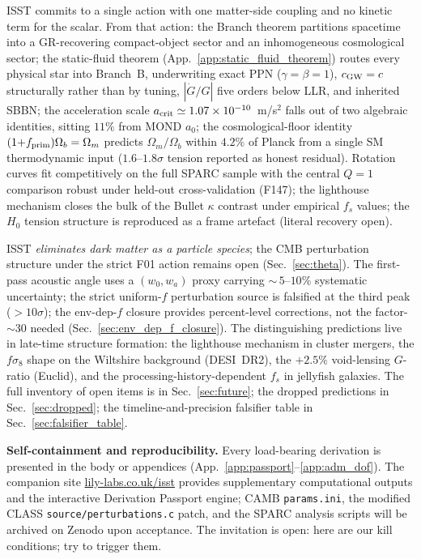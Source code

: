 \documentclass[aps,prd,twocolumn,nofootinbib,floatfix,superscriptaddress]{revtex4-2}
\newcommand{\fprim}{f_{\rm prim}}
\begin{document}
ISST commits to a single action with one matter-side coupling and
no kinetic term for the scalar. From that action: the Branch
theorem partitions spacetime into a GR-recovering compact-object
sector and an inhomogeneous cosmological sector; the static-fluid
theorem (App.~\ref{app:static_fluid_theorem}) routes every physical
star into Branch~B, underwriting exact PPN ($\gamma=\beta=1$),
$c_{\rm GW}=c$ structurally rather than by tuning,
$|\dot G/G|$ five orders below LLR, and inherited SBBN; the
acceleration scale $a_{\rm crit}\simeq 1.07\times 10^{-10}$~m/s$^2$
falls out of two algebraic identities, sitting $11\%$ from MOND
$a_0$; the cosmological-floor identity
$(1{+}\fprim)\Omega_b=\Omega_m$ predicts $\Omega_m/\Omega_b$ within
$4.2\%$ of Planck from a single SM thermodynamic input ($1.6$--$1.8\sigma$
tension reported as honest residual). Rotation curves fit
competitively on the full SPARC sample with the central $Q{=}1$
comparison robust under held-out cross-validation (F147); the
lighthouse mechanism closes the bulk of the Bullet $\kappa$
contrast under empirical $f_s$ values; the $H_0$ tension structure
is reproduced as a frame artefact (literal recovery open).

ISST \emph{eliminates dark matter as a particle species}; the CMB
perturbation structure under the strict F01 action remains open
(Sec.~\ref{sec:theta}). The first-pass acoustic angle uses a
$(w_0,w_a)$ proxy carrying ${\sim}\,5$--$10\%$ systematic
uncertainty; the strict uniform-$f$ perturbation source is
falsified at the third peak ($>10\sigma$); the env-dep-$f$ closure
provides percent-level corrections, not the factor-$\sim\!30$
needed (Sec.~\ref{sec:env_dep_f_closure}). The distinguishing
predictions live in late-time structure formation: the lighthouse
mechanism in cluster mergers, the $f\sigma_8$ shape on the
Wiltshire background (DESI~DR2), the $+2.5\%$ void-lensing
$G$-ratio (Euclid), and the processing-history-dependent $f_s$ in
jellyfish galaxies. The full inventory of open items is in
Sec.~\ref{sec:future}; the dropped predictions in
Sec.~\ref{sec:dropped}; the timeline-and-precision falsifier table
in Sec.~\ref{sec:falsifier_table}.

\textbf{Self-containment and reproducibility.} Every load-bearing
derivation is presented in the body or appendices
(App.~\ref{app:passport}--\ref{app:adm_dof}). The companion site
\href{https://lily-labs.co.uk/isst}{lily-labs.co.uk/isst} provides
supplementary computational outputs and the interactive Derivation
Passport engine; CAMB \texttt{params.ini}, the modified CLASS
\texttt{source/perturbations.c} patch, and the SPARC analysis
scripts will be archived on Zenodo upon acceptance. The invitation
is open: here are our kill conditions; try to trigger them.
\end{document}
